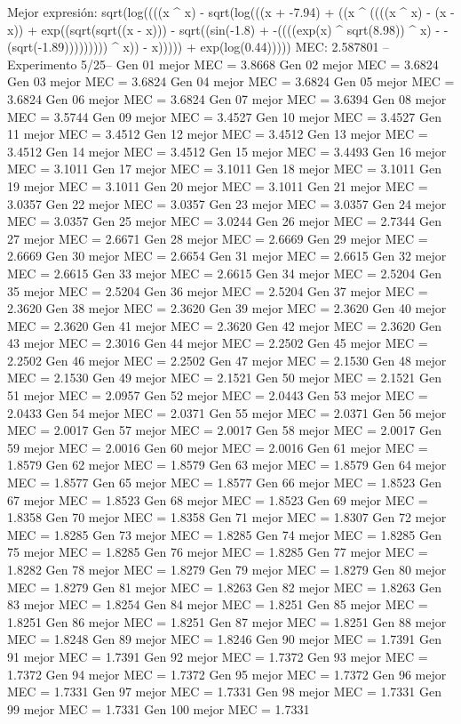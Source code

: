 Mejor expresión: sqrt(log((((x ^ x) - sqrt(log(((x + -7.94) + ((x ^ ((((x ^ x) - (x - x)) + exp((sqrt(sqrt((x - x))) - sqrt((sin(-1.8) + -((((exp(x) ^ sqrt(8.98)) ^ x) - -(sqrt(-1.89))))))))) ^ x)) - x))))) + exp(log(0.44)))))
MEC: 2.587801
--Experimento 
 5/25--
Gen 01 mejor MEC = 3.8668
Gen 02 mejor MEC = 3.6824
Gen 03 mejor MEC = 3.6824
Gen 04 mejor MEC = 3.6824
Gen 05 mejor MEC = 3.6824
Gen 06 mejor MEC = 3.6824
Gen 07 mejor MEC = 3.6394
Gen 08 mejor MEC = 3.5744
Gen 09 mejor MEC = 3.4527
Gen 10 mejor MEC = 3.4527
Gen 11 mejor MEC = 3.4512
Gen 12 mejor MEC = 3.4512
Gen 13 mejor MEC = 3.4512
Gen 14 mejor MEC = 3.4512
Gen 15 mejor MEC = 3.4493
Gen 16 mejor MEC = 3.1011
Gen 17 mejor MEC = 3.1011
Gen 18 mejor MEC = 3.1011
Gen 19 mejor MEC = 3.1011
Gen 20 mejor MEC = 3.1011
Gen 21 mejor MEC = 3.0357
Gen 22 mejor MEC = 3.0357
Gen 23 mejor MEC = 3.0357
Gen 24 mejor MEC = 3.0357
Gen 25 mejor MEC = 3.0244
Gen 26 mejor MEC = 2.7344
Gen 27 mejor MEC = 2.6671
Gen 28 mejor MEC = 2.6669
Gen 29 mejor MEC = 2.6669
Gen 30 mejor MEC = 2.6654
Gen 31 mejor MEC = 2.6615
Gen 32 mejor MEC = 2.6615
Gen 33 mejor MEC = 2.6615
Gen 34 mejor MEC = 2.5204
Gen 35 mejor MEC = 2.5204
Gen 36 mejor MEC = 2.5204
Gen 37 mejor MEC = 2.3620
Gen 38 mejor MEC = 2.3620
Gen 39 mejor MEC = 2.3620
Gen 40 mejor MEC = 2.3620
Gen 41 mejor MEC = 2.3620
Gen 42 mejor MEC = 2.3620
Gen 43 mejor MEC = 2.3016
Gen 44 mejor MEC = 2.2502
Gen 45 mejor MEC = 2.2502
Gen 46 mejor MEC = 2.2502
Gen 47 mejor MEC = 2.1530
Gen 48 mejor MEC = 2.1530
Gen 49 mejor MEC = 2.1521
Gen 50 mejor MEC = 2.1521
Gen 51 mejor MEC = 2.0957
Gen 52 mejor MEC = 2.0443
Gen 53 mejor MEC = 2.0433
Gen 54 mejor MEC = 2.0371
Gen 55 mejor MEC = 2.0371
Gen 56 mejor MEC = 2.0017
Gen 57 mejor MEC = 2.0017
Gen 58 mejor MEC = 2.0017
Gen 59 mejor MEC = 2.0016
Gen 60 mejor MEC = 2.0016
Gen 61 mejor MEC = 1.8579
Gen 62 mejor MEC = 1.8579
Gen 63 mejor MEC = 1.8579
Gen 64 mejor MEC = 1.8577
Gen 65 mejor MEC = 1.8577
Gen 66 mejor MEC = 1.8523
Gen 67 mejor MEC = 1.8523
Gen 68 mejor MEC = 1.8523
Gen 69 mejor MEC = 1.8358
Gen 70 mejor MEC = 1.8358
Gen 71 mejor MEC = 1.8307
Gen 72 mejor MEC = 1.8285
Gen 73 mejor MEC = 1.8285
Gen 74 mejor MEC = 1.8285
Gen 75 mejor MEC = 1.8285
Gen 76 mejor MEC = 1.8285
Gen 77 mejor MEC = 1.8282
Gen 78 mejor MEC = 1.8279
Gen 79 mejor MEC = 1.8279
Gen 80 mejor MEC = 1.8279
Gen 81 mejor MEC = 1.8263
Gen 82 mejor MEC = 1.8263
Gen 83 mejor MEC = 1.8254
Gen 84 mejor MEC = 1.8251
Gen 85 mejor MEC = 1.8251
Gen 86 mejor MEC = 1.8251
Gen 87 mejor MEC = 1.8251
Gen 88 mejor MEC = 1.8248
Gen 89 mejor MEC = 1.8246
Gen 90 mejor MEC = 1.7391
Gen 91 mejor MEC = 1.7391
Gen 92 mejor MEC = 1.7372
Gen 93 mejor MEC = 1.7372
Gen 94 mejor MEC = 1.7372
Gen 95 mejor MEC = 1.7372
Gen 96 mejor MEC = 1.7331
Gen 97 mejor MEC = 1.7331
Gen 98 mejor MEC = 1.7331
Gen 99 mejor MEC = 1.7331
Gen 100 mejor MEC = 1.7331


